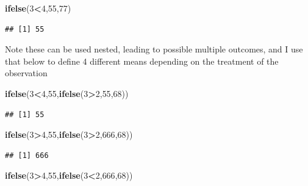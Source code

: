 \documentclass[
]{book}
\newenvironment{Shaded}{\begin{snugshade}}{\end{snugshade}}
\newcommand{\DecValTok}[1]{\textcolor[rgb]{0.00,0.00,0.81}{#1}}
\newcommand{\FunctionTok}[1]{\textcolor[rgb]{0.13,0.29,0.53}{\textbf{#1}}}
\newcommand{\NormalTok}[1]{#1}
\newcommand{\SpecialCharTok}[1]{\textcolor[rgb]{0.81,0.36,0.00}{\textbf{#1}}}
\begin{document}
\begin{Shaded}
\begin{Highlighting}[]
\FunctionTok{ifelse}\NormalTok{(}\DecValTok{3}\SpecialCharTok{\textless{}}\DecValTok{4}\NormalTok{,}\DecValTok{55}\NormalTok{,}\DecValTok{77}\NormalTok{)}
\end{Highlighting}
\end{Shaded}

\begin{verbatim}
## [1] 55
\end{verbatim}

Note these can be used nested, leading to possible multiple outcomes, and I use that below to define 4 different means depending on the treatment of the observation

\begin{Shaded}
\begin{Highlighting}[]
\FunctionTok{ifelse}\NormalTok{(}\DecValTok{3}\SpecialCharTok{\textless{}}\DecValTok{4}\NormalTok{,}\DecValTok{55}\NormalTok{,}\FunctionTok{ifelse}\NormalTok{(}\DecValTok{3}\SpecialCharTok{\textgreater{}}\DecValTok{2}\NormalTok{,}\DecValTok{55}\NormalTok{,}\DecValTok{68}\NormalTok{))}
\end{Highlighting}
\end{Shaded}

\begin{verbatim}
## [1] 55
\end{verbatim}

\begin{Shaded}
\begin{Highlighting}[]
\FunctionTok{ifelse}\NormalTok{(}\DecValTok{3}\SpecialCharTok{\textgreater{}}\DecValTok{4}\NormalTok{,}\DecValTok{55}\NormalTok{,}\FunctionTok{ifelse}\NormalTok{(}\DecValTok{3}\SpecialCharTok{\textgreater{}}\DecValTok{2}\NormalTok{,}\DecValTok{666}\NormalTok{,}\DecValTok{68}\NormalTok{))}
\end{Highlighting}
\end{Shaded}

\begin{verbatim}
## [1] 666
\end{verbatim}

\begin{Shaded}
\begin{Highlighting}[]
\FunctionTok{ifelse}\NormalTok{(}\DecValTok{3}\SpecialCharTok{\textgreater{}}\DecValTok{4}\NormalTok{,}\DecValTok{55}\NormalTok{,}\FunctionTok{ifelse}\NormalTok{(}\DecValTok{3}\SpecialCharTok{\textless{}}\DecValTok{2}\NormalTok{,}\DecValTok{666}\NormalTok{,}\DecValTok{68}\NormalTok{))}
\end{Highlighting}
\end{Shaded}
\end{document}
